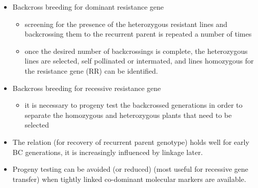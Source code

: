 \documentclass[11pt,dvipsnames,ignorenonframetext,aspectratio=169]{beamer}
\providecommand{\tightlist}{%
  \setlength{\itemsep}{0pt}\setlength{\parskip}{0pt}}
\begin{document}
\begin{frame}{}
\protect\hypertarget{section}{}
\begin{itemize}
\tightlist
\item
  Backcross breeding for dominant resistance gene

  \begin{itemize}
  \tightlist
  \item
    screening for the presence of the \alert{heterozygous} resistant
    lines and backcrossing them to the recurrent parent is repeated a
    number of times
  \item
    once the desired number of backcrossings is complete, the
    heterozygous lines are selected, self pollinated or intermated, and
    lines homozygous for the resistance gene (RR) can be identified.
  \end{itemize}
\item
  Backcross breeding for recessive resistance gene

  \begin{itemize}
  \tightlist
  \item
    it is necessary to progeny test the backcrossed generations in order
    to separate the homozygous and heterozygous plants that need to be
    selected
  \end{itemize}
\item
  The relation (for recovery of recurrent parent genotype) holds well
  for early BC generations, it is increasingly influenced by linkage
  later.
\item
  Progeny testing can be avoided (or reduced) (most useful for recessive
  gene transfer) when tightly linked co-dominant molecular markers are
  available.
\end{itemize}
\end{frame}
\end{document}
